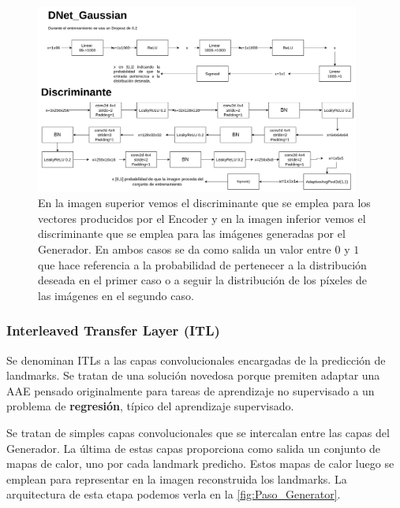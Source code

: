             \begin{figure}[H]
                \centering
                \includegraphics[width=0.95\textwidth]{img/DGaussian.png}
                \caption{En la imagen superior vemos el discriminante que se emplea para los vectores producidos por el Encoder y en la imagen inferior vemos el discriminante que se emplea para las imágenes generadas por el Generador. En ambos casos se da como salida un valor entre $0$ y $1$ que hace referencia a la probabilidad de pertenecer a la distribución deseada en el primer caso o a seguir la distribución de los píxeles de las imágenes en el segundo caso.}
                \label{fig:DGaussian}
            \end{figure}

            \subsubsection{Interleaved Transfer Layer (ITL)}
                \noindent Se denominan ITLs a las capas convolucionales encargadas de la predicción de landmarks. Se tratan de una solución novedosa porque premiten adaptar una AAE pensado originalmente para tareas de aprendizaje no supervisado a un problema de \textbf{regresión}, típico del aprendizaje supervisado.

                \medskip
                
                \noindent Se tratan de simples capas convolucionales que se intercalan entre las capas del Generador. La última de estas capas proporciona como salida un conjunto de mapas de calor, uno por cada landmark predicho. Estos mapas de calor luego se emplean para representar en la imagen reconstruida los landmarks. La arquitectura de esta etapa podemos verla en la \autoref{fig:Paso_Generator}.
            
